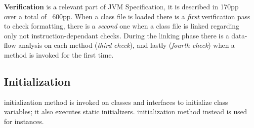 \textbf{Verification} is a relevant part of JVM Specification, it is described in 170pp over a total of ~600pp.
When a class file is loaded there is a \textit{first} verification pass to check formatting, 
there is a \textit{second} one when a class file is linked regarding only not instruction-dependant checks.
During the linking phase there is a data-flow analysis on each method (\textit{third check}),
and lastly (\textit{fourth check}) when a method is invoked for the first time.

\subsection{Initialization}
 initialization method is invoked on classes
and interfaces to initialize class variables;
it also executes static initializers.
 initialization method instead is used for instances.

